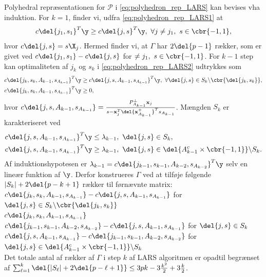 Polyhedral repræsentationen for \(\mathcal{P}\) i \eqref{eq:polyhedron_rep_LARS} kan bevises vha induktion.
For \(k=1\), finder vi, udfra \eqref{eq:polyhedron_rep_LARS1} at
\begin{align*}
c \del{j_1, s_1}^T \y \geq c \del{j,s}^T \y, \ \forall j \neq j_1, \ s \in \cbr{-1,1},
\end{align*}
hvor \(c \del{j,s} = s \X_j\).
Hermed finder vi, at \(\Gamma\) har \(2 \del{p-1}\) rækker, som er givet ved \(c \del{j_1, s_1} - c \del{j, s}\) for \( \neq j_1, \ s \in \cbr{-1,1}\).
For \(k-1\) step kan optimaliteten af \(j_k\) og \(s_k\) i \eqref{eq:polyhedron_rep_LARS2} udtrykkes som
\begin{align*}
c \del{j_k, s_k, A_{k-1}, s_{A_{k-1}}}^T \y &\geq c \del{j, s, A_{k-1}, s_{A_{k-1}}}^T \y, \ \forall \del{j,s} \in S_k \backslash \cbr{\del{j_k, s_k}}, \\
c \del{j_k, s_k, A_{k-1}, s_{A_{k-1}}}^T \y &\geq 0,
\end{align*}
hvor \(c \del{j, s, A_{k-1}, s_{A_{k-1}}} = \frac{P_{A_{k-1}}^\perp \mathbf{x}_j}{s - \mathbf{x}_j^T \del{\mathbf{x}_{A_{k-1}}^+}^T s_{A_{k-1}}}\).
Mængden \(S_k\) er karakteriseret ved
\begin{align*}
c \del{j, s, A_{k-1}, s_{A_{k-1}}}^T \y &\leq \lambda_{k-1}, \ \del{j,s} \in S_k, \\
c \del{j, s, A_{k-1}, s_{A_{k-1}}}^T \y &\geq \lambda_{k-1}, \ \del{j,s} \in \del{A_{k-1}^c \times \cbr{-1,1}} \backslash S_k.
\end{align*}
Af induktionshypotesen er \(\lambda_{k-1} = c \del{j_{k-1}, s_{k-1}, A_{k-2}, s_{A_{k-2}}}^T \y\) selv en lineær funktion af \(\y\).
Derfor konstrueres \(\Gamma\) ved at tilføje følgende \(\vert S_k \vert + 2 \del{p-k+1}\) rækker til førnævnte matrix: 
\(c \del{j_k, s_k, A_{k-1}, s_{A_{k-1}}} - c \del{j, s, A_{k-1}, s_{A_{k-1}}}\) for \(\del{j,s} \in S_k \backslash \cbr{\del{j_k, s_k}}\) \\
\(c \del{j_k, s_k, A_{k-1}, s_{A_{k-1}}}\) \\
\(c \del{j_{k-1}, s_{k-1}, A_{k-2}, s_{A_{k-2}}}  - c \del{j, s, A_{k-1}, s_{A_{k-1}}}\) for \(\del{j,s} \in S_k\) \\
\(c \del{j, s, A_{k-1}, s_{A_{k-1}}} - c \del{j_{k-1}, s_{k-1}, A_{k-2}, s_{A_{k-2}}}\) for \(\del{j,s} \in \del{A_{k-1}^c \times \cbr{-1,1}} \backslash S_k\) \\
Det totale antal af rækker af \(\Gamma\) i step \(k\) af LARS algoritmen er opadtil begrænset af \(\sum_{\ell=1}^k \del{\vert S_\ell \vert + 2 \del{p - \ell + 1}} \leq 3 pk - 3 \frac{k^2}{2} + 3 \frac{k}{2}\).

